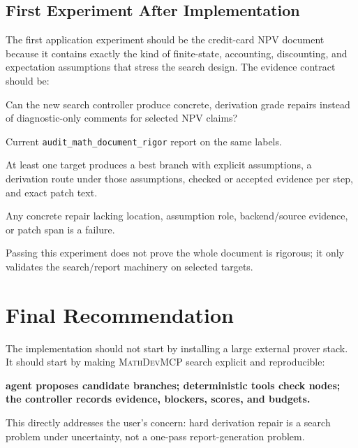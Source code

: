 \documentclass[11pt]{article}
\newcommand{\MathDevMCP}{\textsc{MathDevMCP}}
\begin{document}
\subsection{First Experiment After Implementation}

The first application experiment should be the credit-card NPV document because
it contains exactly the kind of finite-state, accounting, discounting, and
expectation assumptions that stress the search design. The evidence contract
should be:

\begin{description}[leftmargin=*]
\item[Question.] Can the new search controller produce concrete, derivation
grade repairs instead of diagnostic-only comments for selected NPV claims?
\item[Baseline.] Current \texttt{audit\_math\_document\_rigor} report on the
same labels.
\item[Promotion criterion.] At least one target produces a best branch with
  explicit assumptions, a derivation route under those assumptions, checked or
  accepted evidence per step, and exact patch text.
\item[Veto diagnostics.] Any concrete repair lacking location, assumption role,
  backend/source evidence, or patch span is a failure.
\item[Non-claim.] Passing this experiment does not prove the whole document is
  rigorous; it only validates the search/report machinery on selected targets.
\end{description}

\section{Final Recommendation}

The implementation should not start by installing a large external prover
stack. It should start by making \MathDevMCP{} search explicit and
reproducible:

\begin{center}
\textbf{agent proposes candidate branches; deterministic tools check nodes;
the controller records evidence, blockers, scores, and budgets.}
\end{center}

This directly addresses the user's concern: hard derivation repair is a search
problem under uncertainty, not a one-pass report-generation problem.
\end{document}
